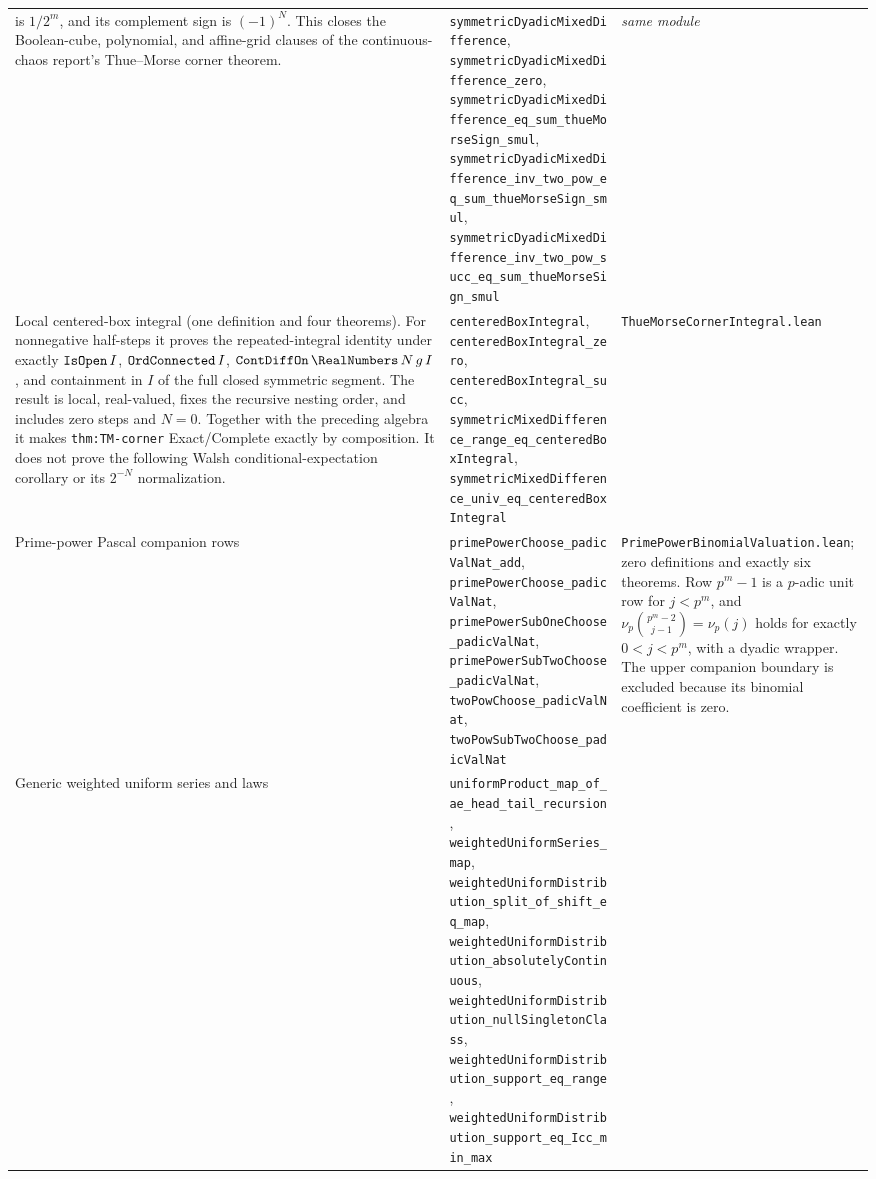 \documentclass[11pt,oneside]{article}
\theoremstyle{definition}
\theoremstyle{remark}
\newcommand{\lean}[1]{%
  \ifmmode\text{\texttt{\detokenize{#1}}}\else\nolinkurl{#1}\fi}
\begin{document}
\begin{longtable}{@{}p{}p{}p{}@{}}
is \(1/2^m\), and its complement sign is \((-1)^N\).  This closes the
Boolean-cube, polynomial, and affine-grid clauses of the continuous-chaos
report's Thue--Morse corner theorem. &
\nolinkurl{symmetricDyadicMixedDifference},
\nolinkurl{symmetricDyadicMixedDifference_zero},
\nolinkurl{symmetricDyadicMixedDifference_eq_sum_thueMorseSign_smul},
\nolinkurl{symmetricDyadicMixedDifference_inv_two_pow_eq_sum_thueMorseSign_smul},
\nolinkurl{symmetricDyadicMixedDifference_inv_two_pow_succ_eq_sum_thueMorseSign_smul} &
\emph{same module} \\
Local centered-box integral (one definition and four theorems).  For
nonnegative half-steps it proves the repeated-integral identity under exactly
\(\lean{IsOpen}\,I\), \(\lean{OrdConnected}\,I\),
\(\lean{ContDiffOn}\,\RealNumbers\,N\,g\,I\), and containment in \(I\) of the
full closed symmetric segment.  The result is local, real-valued, fixes the
recursive nesting order, and includes zero steps and \(N=0\).  Together with
the preceding algebra it makes \nolinkurl{thm:TM-corner} Exact/Complete exactly by
composition.  It does not prove the following Walsh conditional-expectation
corollary or its \(2^{-N}\) normalization. &
\nolinkurl{centeredBoxIntegral},
\nolinkurl{centeredBoxIntegral_zero},
\nolinkurl{centeredBoxIntegral_succ},
\nolinkurl{symmetricMixedDifference_range_eq_centeredBoxIntegral},
\nolinkurl{symmetricMixedDifference_univ_eq_centeredBoxIntegral} &
\nolinkurl{ThueMorseCornerIntegral.lean} \\
Prime-power Pascal companion rows &
\nolinkurl{primePowerChoose_padicValNat_add},
\nolinkurl{primePowerChoose_padicValNat},
\nolinkurl{primePowerSubOneChoose_padicValNat},
\nolinkurl{primePowerSubTwoChoose_padicValNat},
\nolinkurl{twoPowChoose_padicValNat},
\nolinkurl{twoPowSubTwoChoose_padicValNat} &
\nolinkurl{PrimePowerBinomialValuation.lean}; zero definitions and exactly
six theorems.  Row \(p^m-1\) is a \(p\)-adic unit row for \(j<p^m\), and
\(\nu_p\binom{p^m-2}{j-1}=\nu_p(j)\) holds for exactly \(0<j<p^m\), with a
dyadic wrapper.  The upper companion boundary is excluded because its
binomial coefficient is zero. \\
Generic weighted uniform series and laws &
\nolinkurl{uniformProduct_map_of_ae_head_tail_recursion},
\nolinkurl{weightedUniformSeries_map},
\nolinkurl{weightedUniformDistribution_split_of_shift_eq_map},
\nolinkurl{weightedUniformDistribution_absolutelyContinuous},
\nolinkurl{weightedUniformDistribution_nullSingletonClass},
\nolinkurl{weightedUniformDistribution_support_eq_range},
\nolinkurl{weightedUniformDistribution_support_eq_Icc_min_max} &

\end{longtable}
\end{document}
